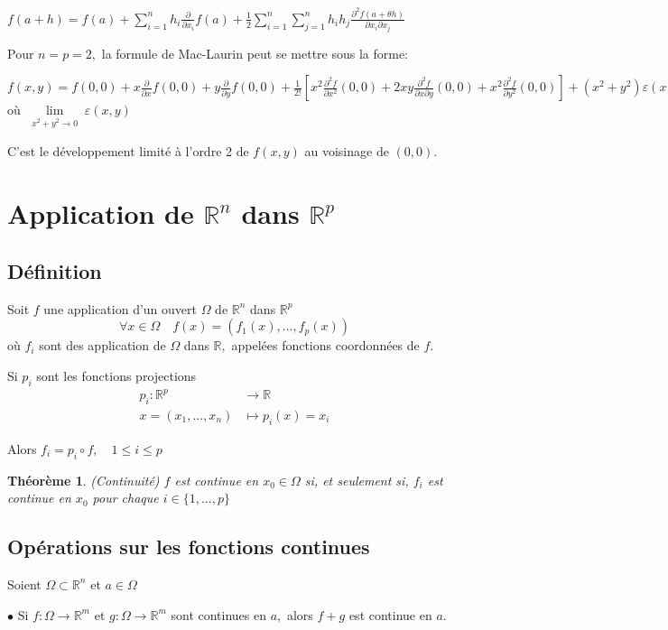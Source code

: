 \documentclass[11pt,a4paper]{report}
\newtheorem{theorem}{Théorème}[section]
\begin{document}
$f(a+h)=f(a)+\sum\limits_{i=1}^{n}h_i\frac{\partial}{\partial x_i}f(a)+\frac{1}{2}\sum\limits_{i=1}^{n}\sum\limits_{j=1}^{n}h_i h_j\frac{\partial^2 f(a+\theta h)}{\partial x_i \partial x_j}$

Pour $n=p=2,$ la formule de Mac-Laurin peut se mettre sous la forme:

$f(x,y)=f(0,0)+x\frac{\partial}{\partial x}f(0,0)+y\frac{\partial}{\partial y}f(0,0)+\frac{1}{2!}[x^2\frac{\partial^2 f}{\partial x^2}(0,0)+2xy\frac{\partial^2 f}{\partial x\partial y }(0,0)+x^2\frac{\partial^2 f}{\partial y^2}(0,0)]+(x^2+y^2)\varepsilon(x,y)$ où $\lim\limits_{\substack{x^2+y^2 \rightarrow 0}}\varepsilon(x,y)$

C'est le développement limité à l'ordre 2 de $f(x,y)$ au voisinage de $(0,0).$

\section{Application de $\mathbb{R}^n$ dans $\mathbb{R}^p$}
\subsection{Définition}
Soit $f$ une application d'un ouvert $\Omega$ de $\mathbb{R}^n$ dans $\mathbb{R}^p$
$$\forall x\in \Omega\quad f(x)=(f_1(x),...,f_p(x))$$
où $f_i$ sont des application de $\Omega$ dans $\mathbb{R},$ appelées fonctions coordonnées de $f.$

Si $p_i$ sont les fonctions projections
\begin{align*}
p_i:\mathbb{R}^p &\rightarrow \mathbb{R}\\
x=(x_1,...,x_n)&\mapsto p_i(x)=x_i
\end{align*}

Alors $f_i=p_i\circ f,\quad 1\leq i\leq p$

\begin{theorem}(Continuité)
$f$ est continue en $x_0\in \Omega$ si, et seulement si, $f_i$ est continue en $x_0$ pour chaque $i\in \{1,...,p\}$
\end{theorem}
\subsection{Opérations sur les fonctions continues}
Soient $\Omega\subset\mathbb{R}^n$ et $a\in \Omega$

$\bullet$ Si $f:\Omega\rightarrow \mathbb{R}^m$ et $g:\Omega\rightarrow \mathbb{R}^m$ sont continues en $a,$ alors $f+g$ est continue en $a.$
\end{document}
